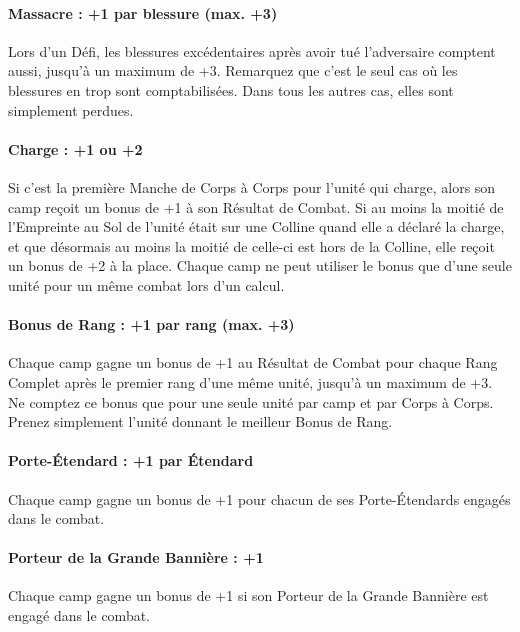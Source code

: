 \paragraph{Massacre : +1 par blessure (max. +3)}

Lors d'un Défi, les blessures excédentaires après avoir tué l'adversaire comptent aussi, jusqu'à un maximum de +3. Remarquez que c'est le seul cas où les blessures en trop sont comptabilisées. Dans tous les autres cas, elles sont simplement perdues.

\paragraph{Charge : +1 ou +2}

Si c'est la première Manche de Corps à Corps pour l'unité qui charge, alors son camp reçoit un bonus de +1 à son Résultat de Combat. Si au moins la moitié de l'Empreinte au Sol de l'unité était sur une Colline quand elle a déclaré la charge, et que désormais au moins la moitié de celle-ci est hors de la Colline, elle reçoit un bonus de +2 à la place. Chaque camp ne peut utiliser le bonus que d'une seule unité pour un même combat lors d'un calcul.

\paragraph{Bonus de Rang : +1 par rang (max. +3)}

Chaque camp gagne un bonus de +1 au Résultat de Combat pour chaque Rang Complet après le premier rang d'une même unité, jusqu'à un maximum de +3. Ne comptez ce bonus que pour une seule unité par camp et par Corps à Corps. Prenez simplement l'unité donnant le meilleur Bonus de Rang.

\paragraph{Porte-Étendard : +1 par Étendard}

Chaque camp gagne un bonus de +1 pour chacun de ses Porte-Étendards engagés dans le combat.

\paragraph{Porteur de la Grande Bannière : +1}

Chaque camp gagne un bonus de +1 si son Porteur de la Grande Bannière est engagé dans le combat.

